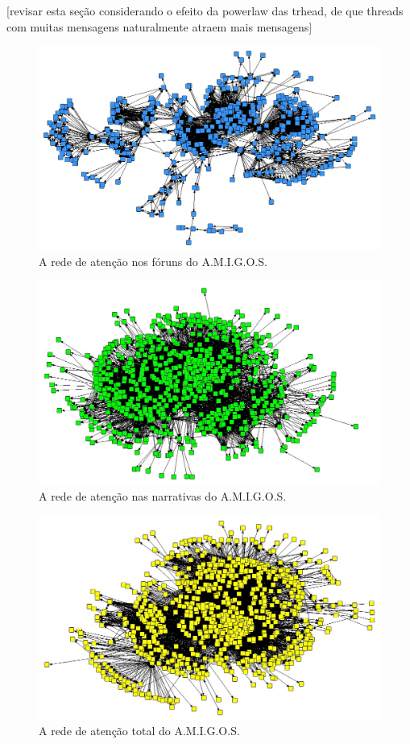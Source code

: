 \documentclass{article}
\begin{document}
[revisar esta seção considerando o efeito da powerlaw das trhead, de que
threads com muitas mensagens naturalmente atraem mais mensagens]

\begin{figure}[h!]
  \caption{A rede de atenção nos fóruns do A.M.I.G.O.S.}
  \centering
    \includegraphics[width=\textwidth]{imgs/amigos-topicos.jpg}
\end{figure}

\begin{figure}[h!]
  \caption{A rede de atenção nas narrativas do A.M.I.G.O.S.}
  \centering
    \includegraphics[width=\textwidth]{imgs/amigos-narrativas.jpg}
\end{figure}

\begin{figure}[h!]
  \caption{A rede de atenção total do A.M.I.G.O.S.}
  \centering
    \includegraphics[width=\textwidth]{imgs/amigos-atencao.jpg}
\end{figure}
\end{document}
